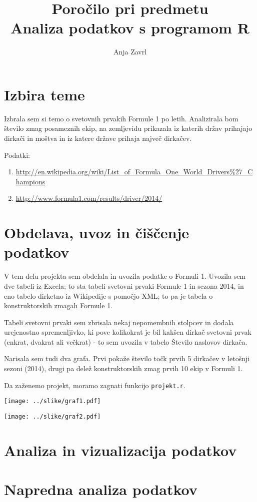 \documentclass[11pt,a4paper]{article}
\begin{document}
\title{Poročilo pri predmetu \\
Analiza podatkov s programom R}
\author{Anja Zavrl}
\maketitle

\section{Izbira teme}

Izbrala sem si temo o svetovnih prvakih Formule 1 po letih. Analizirala bom število zmag posameznih ekip, na zemljevidu prikazala iz katerih držav prihajajo dirkači in moštva in iz katere države prihaja največ dirkačev. 

Podatki: 
\begin{enumerate}
\item \url{http://en.wikipedia.org/wiki/List_of_Formula_One_World_Drivers%27_Champions}
\item \url{http://www.formula1.com/results/driver/2014/}
\end{enumerate}

\section{Obdelava, uvoz in čiščenje podatkov}

V tem delu projekta sem obdelala in uvozila podatke o Formuli 1. Uvozila sem dve tabeli iz Excela; to sta tabeli
svetovni prvaki Formule 1 in sezona 2014, in eno tabelo dirketno iz Wikipedije s pomočjo XML; to pa je tabela o konstruktorskih zmagah Formule 1. 

Tabeli svetovni prvaki sem zbrisala nekaj nepomembnih stolpcev in dodala urejenostno spremenljivko, ki pove kolikokrat je bil kakšen dirkač svetovni prvak (enkrat, dvakrat ali večkrat) - to sem uvozila v tabelo Število naslovov dirkača.

Narisala sem tudi dva grafa. Prvi pokaže število točk prvih 5 dirkačev v letošnji sezoni (2014), drugi pa delež konstruktorskih zmag prvih 10 ekip v Formuli 1.

Da zaženemo projekt, moramo zagnati funkcijo \verb|projekt.r|.

\texttt{[image: ../slike/graf1.pdf]}

\texttt{[image: ../slike/graf2.pdf]}


\section{Analiza in vizualizacija podatkov}


\section{Napredna analiza podatkov}

\end{document}
